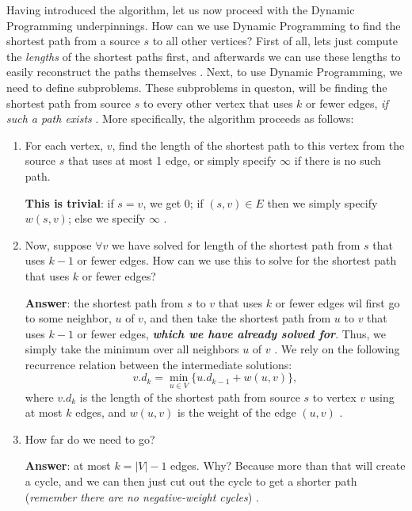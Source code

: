 \documentclass[a4paper, 12pt]{report}
\theoremstyle{definition}
\begin{document}
Having introduced the algorithm, let us now proceed with the Dynamic Programming underpinnings. How can we use Dynamic Programming to find the shortest path from a source \(s\) to all other vertices?
First of all, lets just compute the \emph{lengths} of the shortest paths first, and afterwards we can use these lengths to easily reconstruct the paths themselves \cite{toyota:2019}. Next, to use Dynamic Programming, we need to define subproblems.
These subproblems in queston, will be finding the shortest path from source \(s\) to every other vertex that uses \(k\) or fewer edges, \emph{if such a path exists} \cite{toyota:2019}. More specifically, the algorithm proceeds as follows:
\begin{enumerate}
    \item For each vertex, \(v\), find the length of the shortest path to this vertex from the source \(s\) that uses at most 1 edge, or simply specify \(\infty\) if there is no such path.
    
    \textbf{This is trivial}: if $s = v$, we get 0; if $(s, v) \in E$ then we simply specify $w(s, v)$; else we specify \(\infty\) \cite{cormenBk,toyota:2019}.
    \item Now, suppose $\forall v$ we have solved for length of the shortest path from \(s\) that uses \(k - 1\) or fewer edges. How can we use this to solve for the shortest path that uses \(k\) or fewer edges?
    
    \textbf{Answer}: the shortest path from \(s\) to \(v\) that uses \(k\) or fewer edges wil first go to some neighbor, \(u\) of \(v\), and then take the shortest path from \(u\) to \(v\) that uses \(k - 1\) or fewer edges, 
    \emph{\textbf{which we have already solved for}}. Thus, we simply take the minimum over all neighbors \(u\) of \(v\) \cite{toyota:2019,stand:bford:12}. We rely on the following recurrence relation between the intermediate solutions:
    \begin{equation}
        v.d_{k} = \min_{u \in V}\{u.d_{k-1} + w(u, v)\},
    \end{equation}
    where $v.d_{k}$ is the length of the shortest path from source \(s\) to vertex \(v\) using at most \(k\) edges, and \(w(u, v)\) is the weight of the edge \((u, v)\) \cite{toyota:2019,stand:bford:12}.  
    \item How far do we need to go?
    
    \textbf{Answer}: at most \(k = |V| - 1\) edges. Why? Because more than that will create a cycle, and we can then just cut out the cycle to get a shorter path (\emph{remember there are no negative-weight cycles}) \cite{toyota:2019}.
\end{enumerate}
\end{document}
